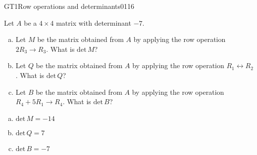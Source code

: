 \begin{exercise}{GT1}{Row operations and determinants}{0116} 
\begin{exerciseStatement} 

Let \(A\) be a \(4 \times 4\) matrix with determinant \(-7\).

 

\begin{enumerate}[(a)]
\item Let \(M\) be the matrix obtained from \(A\) by applying the row operation \(2 R_3 \to R_3\). What is \(\mathrm{det}\,M\)?
\item Let \(Q\) be the matrix obtained from \(A\) by applying the row operation \(R_1 \leftrightarrow R_2\). What is \(\mathrm{det}\,Q\)?
\item Let \(B\) be the matrix obtained from \(A\) by applying the row operation \(R_4 + 5 R_1 \to R_4\). What is \(\mathrm{det}\,B\)?
\end{enumerate}

     \end{exerciseStatement}
 \begin{exerciseAnswer} 

\begin{enumerate}[(a)]
\item \(\mathrm{det}\,M=-14\)
\item \(\mathrm{det}\,Q=7\)
\item \(\mathrm{det}\,B=-7\)
\end{enumerate}

     \end{exerciseAnswer}
 \end{exercise}


\newpage




